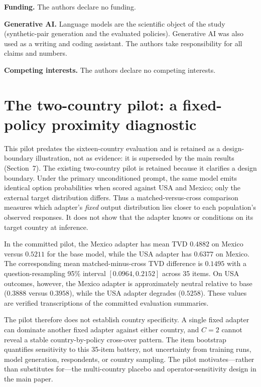 \documentclass[10pt,letterpaper]{article}
\begin{document}
\noindent\textbf{Funding.} The authors declare no funding.

\noindent\textbf{Generative AI.} Language models are the scientific object of the study (synthetic-pair generation and the evaluated policies). Generative AI was also used as a writing and coding assistant. The authors take responsibility for all claims and numbers.

\noindent\textbf{Competing interests.} The authors declare no competing interests.

\newpage
\appendix
\section{The two-country pilot: a fixed-policy proximity diagnostic}
This pilot predates the sixteen-country evaluation and is retained as a design-boundary illustration, not as evidence: it is superseded by the main results (Section~7). The existing two-country pilot is retained because it clarifies a design boundary. Under the primary unconditioned prompt, the same model emits identical option probabilities when scored against USA and Mexico; only the external target distribution differs. Thus a matched-versus-cross comparison measures which adapter's \emph{fixed} output distribution lies closer to each population's observed responses. It does not show that the adapter knows or conditions on its target country at inference.

In the committed pilot, the Mexico adapter has mean TVD $0.4882$ on Mexico versus $0.5211$ for the base model, while the USA adapter has $0.6377$ on Mexico. The corresponding mean matched-minus-cross TVD difference is $0.1495$ with a question-resampling 95\% interval $[0.0964,0.2152]$ across 35 items. On USA outcomes, however, the Mexico adapter is approximately neutral relative to base ($0.3888$ versus $0.3958$), while the USA adapter degrades ($0.5258$). These values are verified transcriptions of the committed evaluation summaries.

The pilot therefore does not establish country specificity. A single fixed adapter can dominate another fixed adapter against either country, and $C=2$ cannot reveal a stable country-by-policy cross-over pattern. The item bootstrap quantifies sensitivity to this 35-item battery, not uncertainty from training runs, model generation, respondents, or country sampling. The pilot motivates---rather than substitutes for---the multi-country placebo and operator-sensitivity design in the main paper.
\end{document}
